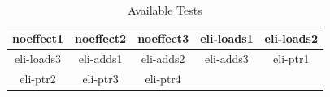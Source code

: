 \documentclass[9pt,sigconf]{acmart}
\begin{document}
	\begin{table}
		\caption{Available Tests}
		\label{tab:tests}
		\begin{tabular}{|c|c|c|c|c|}
			\hline
			noeffect1 & noeffect2 & noeffect3 & eli-loads1 & eli-loads2 \\
			\hline
			eli-loads3 & eli-adds1 & eli-adds2 & eli-adds3 & eli-ptr1 \\
			\hline
			eli-ptr2 & eli-ptr3 & eli-ptr4 & & \\
			\hline
		\end{tabular}
	\end{table}
\end{document}
